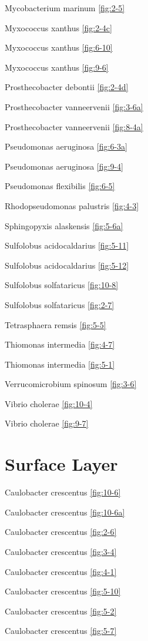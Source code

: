 \documentclass[]{tufte-book}
\begin{document}
Mycobacterium marinum \ref{fig:2-5}

Myxococcus xanthus \ref{fig:2-4c}

Myxococcus xanthus \ref{fig:6-10}

Myxococcus xanthus \ref{fig:9-6}

Prosthecobacter debontii \ref{fig:2-4d}

Prosthecobacter vanneervenii \ref{fig:3-6a}

Prosthecobacter vanneervenii \ref{fig:8-4a}

Pseudomonas aeruginosa \ref{fig:6-3a}

Pseudomonas aeruginosa \ref{fig:9-4}

Pseudomonas flexibilis \ref{fig:6-5}

Rhodopseudomonas palustris \ref{fig:4-3}

Sphingopyxis alaskensis \ref{fig:5-6a}

Sulfolobus acidocaldarius \ref{fig:5-11}

Sulfolobus acidocaldarius \ref{fig:5-12}

Sulfolobus solfataricus \ref{fig:10-8}

Sulfolobus solfataricus \ref{fig:2-7}

Tetrasphaera remsis \ref{fig:5-5}

Thiomonas intermedia \ref{fig:4-7}

Thiomonas intermedia \ref{fig:5-1}

Verrucomicrobium spinosum \ref{fig:3-6}

Vibrio cholerae \ref{fig:10-4}

Vibrio cholerae \ref{fig:9-7}

\section{\texorpdfstring{\textbf{Surface
Layer}}{Surface Layer}}\label{surface-layer}

Caulobacter crescentus \ref{fig:10-6}

Caulobacter crescentus \ref{fig:10-6a}

Caulobacter crescentus \ref{fig:2-6}

Caulobacter crescentus \ref{fig:3-4}

Caulobacter crescentus \ref{fig:4-1}

Caulobacter crescentus \ref{fig:5-10}

Caulobacter crescentus \ref{fig:5-2}

Caulobacter crescentus \ref{fig:5-7}
\end{document}
